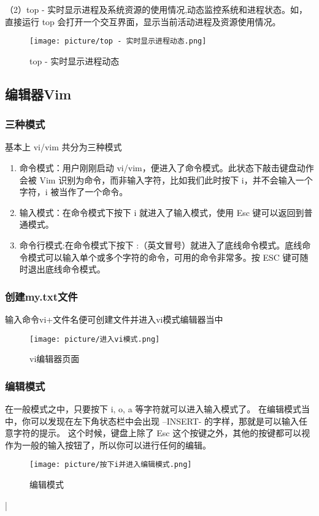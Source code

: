 \documentclass[UTF8]{ctexart}
\begin{document}
（2）top - 实时显示进程及系统资源的使用情况,动态监控系统和进程状态。如，直接运行 top 会打开一个交互界面，显示当前活动进程及资源使用情况。
\begin{figure}[H]
    \centering
    \texttt{[image: picture/top - 实时显示进程动态.png]}
    \caption{top - 实时显示进程动态}
\end{figure}


\subsection{编辑器Vim}


\subsubsection{三种模式}
基本上 vi/vim 共分为三种模式
\begin{enumerate}
    \item 命令模式：用户刚刚启动 vi/vim，便进入了命令模式。此状态下敲击键盘动作会被 Vim 识别为命令，而非输入字符，比如我们此时按下 i，并不会输入一个字符，i 被当作了一个命令。
    
    \item 输入模式：在命令模式下按下 i 就进入了输入模式，使用 Esc 键可以返回到普通模式。
    
    \item 命令行模式:在命令模式下按下 :（英文冒号）就进入了底线命令模式。底线命令模式可以输入单个或多个字符的命令，可用的命令非常多。按 ESC 键可随时退出底线命令模式。
    
\end{enumerate}

\subsubsection{创建my.txt文件}
输入命令vi+文件名便可创建文件并进入vi模式编辑器当中
\begin{figure}[H]
    \centering
    \texttt{[image: picture/进入vi模式.png]}
    \caption{vi编辑器页面}
\end{figure}

\subsubsection{编辑模式}
在一般模式之中，只要按下 i, o, a 等字符就可以进入输入模式了。
在编辑模式当中，你可以发现在左下角状态栏中会出现 –INSERT- 的字样，那就是可以输入任意字符的提示。
这个时候，键盘上除了 Esc 这个按键之外，其他的按键都可以视作为一般的输入按钮了，所以你可以进行任何的编辑。
\begin{figure}[H]
    \centering
    \texttt{[image: picture/按下i并进入编辑模式.png]}
    \caption{编辑模式}
\end{figure}|
\end{document}
